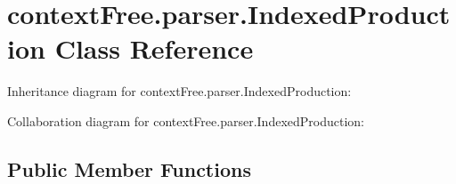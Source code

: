\hypertarget{classcontext_free_1_1parser_1_1_indexed_production}{\section{context\-Free.\-parser.\-Indexed\-Production Class Reference}
\label{classcontext_free_1_1parser_1_1_indexed_production}
}


Inheritance diagram for context\-Free.\-parser.\-Indexed\-Production\-:


Collaboration diagram for context\-Free.\-parser.\-Indexed\-Production\-:
\subsection*{Public Member Functions}
